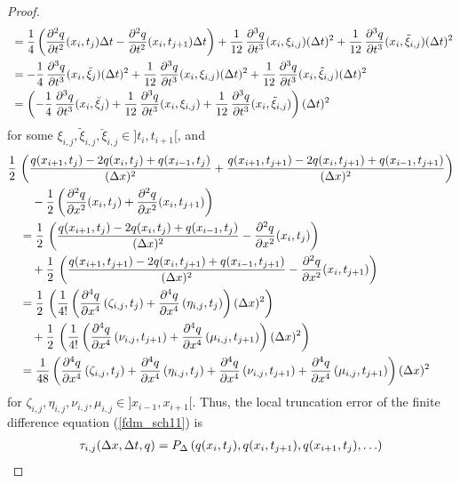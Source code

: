 \begin{proof}
\begin{align*}
& \ = \frac{1}{4} \left( \frac{\partial^{2}{q}}{\partial{t}^{2}}(x_i,t_j) \Delta{t}
- \frac{\partial^{2}{q}}{\partial{t}^{2}}(x_i,t_{j+1}) \Delta{t} \right)
+ \frac{1}{12}\, \frac{\partial^{3}{q}}{\partial{t}^{3}}(x_i,\xi_{i,j}) (\Delta{t})^2
+ \frac{1}{12}\, \frac{\partial^{3}{q}}{\partial{t}^{3}}(x_i,\tilde{\xi}_{i,j}) (\Delta{t})^2 \\
&\ = -\frac{1}{4}\, \frac{\partial^{3}{q}}{\partial{t}^{3}}(x_i,\breve{\xi}_j) (\Delta{t})^2
+ \frac{1}{12}\, \frac{\partial^{3}{q}}{\partial{t}^{3}}(x_i,\xi_{i,j}) (\Delta{t})^2
+ \frac{1}{12}\, \frac{\partial^{3}{q}}{\partial{t}^{3}}(x_i,\tilde{\xi}_{i,j}) (\Delta{t})^2 \\
&\ = \left( -\frac{1}{4}\, \frac{\partial^{3}{q}}{\partial{t}^{3}}(x_i,\breve{\xi}_j)
+ \frac{1}{12}\, \frac{\partial^{3}{q}}{\partial{t}^{3}}(x_i,\xi_{i,j})
+ \frac{1}{12}\, \frac{\partial^{3}{q}}{\partial{t}^{3}}(x_i,\tilde{\xi}_{i,j}) \right) (\Delta{t})^2
\end{align*}
for some $\xi_{i,j}, \tilde{\xi}_{i,j},\breve{\xi}_{i,j} \in ]t_i,t_{i+1}[$, and
\begin{align*}
& \frac{1}{2} \, \left( \frac{q(x_{i+1},t_j) - 2 q(x_i,t_j) +
q(x_{i-1},t_j)}{(\Delta{x})^2}
+ \frac{q(x_{i+1},t_{j+1}) - 2q(x_i,t_{j+1}) + q(x_{i-1},t_{j+1})}
  {(\Delta{x})^2} \right) \\
&\qquad - \frac{1}{2} \left( \frac{\partial^{2}{q}}{\partial{x}^{2}}(x_i,t_j) +
\frac{\partial^{2}{q}}{\partial{x}^{2}}(x_i,t_{j+1}) \right) \\
&\quad = \frac{1}{2} \, \left( \frac{q(x_{i+1},t_j) - 2 q(x_i,t_j) +
q(x_{i-1},t_j)}{(\Delta{x})^2} - \frac{\partial^{2}{q}}{\partial{x}^{2}}(x_i,t_j) \right) \\
& \qquad + \frac{1}{2}\, \left(
\frac{q(x_{i+1},t_{j+1}) - 2q(x_i,t_{j+1}) + q(x_{i-1},t_{j+1})}
{(\Delta{x})^2} - \frac{\partial^{2}{q}}{\partial{x}^{2}}(x_i,t_{j+1}) \right) \\
&\quad = \frac{1}{2} \, \left(
\frac{1}{4!} \left( \frac{\partial^{4}{q}}{\partial{x}^{4}}\left(\zeta_{i,j},t_j\right)
+ \frac{\partial^{4}{q}}{\partial{x}^{4}}\left(\eta_{i,j},t_j\right) \right) (\Delta{x})^2 \right)\\
&\qquad + \frac{1}{2} \, \left(
\frac{1}{4!} \left( \frac{\partial^{4}{q}}{\partial{x}^{4}}\left(\nu_{i,j},t_{j+1}\right)
+ \frac{\partial^{4}{q}}{\partial{x}^{4}}\left(\mu_{i,j},t_{j+1}\right)\right) (\Delta{x})^2 \right) \\
&\quad = \frac{1}{48} \left( \frac{\partial^{4}{q}}{\partial{x}^{4}}\left(\zeta_{i,j},t_j\right)
+ \frac{\partial^{4}{q}}{\partial{x}^{4}}\left(\eta_{i,j},t_j\right)
+ \frac{\partial^{4}{q}}{\partial{x}^{4}}\left(\nu_{i,j},t_{j+1}\right)
+ \frac{\partial^{4}{q}}{\partial{x}^{4}}\left(\mu_{i,j},t_{j+1}\right)\right) (\Delta{x})^2
\end{align*}
for $\zeta_{i,j}, \eta_{i,j},\nu_{i,j},\mu_{i,j} \in ]x_{i-1},x_{i+1}[$.
Thus, the local truncation error of the finite difference equation
(\ref{fdm_sch11}) is
\begin{align*}
\tau_{i,j}(\dtx{x},\dtx{t},q)
&= P_\Delta\left(q(x_i,t_j), q(x_i,t_{j+1}), q(x_{i+1},t_j), \ldots\right) \\

\end{align*}
\end{proof}
